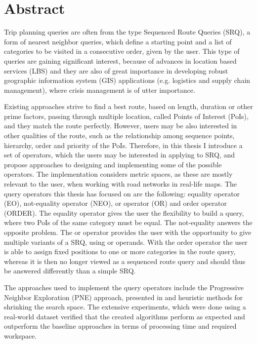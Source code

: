 \chapter{Abstract}
\enlargethispage*{30pt}

Trip planning queries are often from the type Sequenced Route Queries (SRQ), a form of nearest neighbor queries, which define a starting point and a list of categories to be visited in a consecutive order, given by the user. This type of queries are gaining significant interest, because of advances in location based services (LBS) and they are also of great importance in developing robust geographic information system (GIS) applications (e.g. logistics and supply chain management), where crisis management is of utter importance. 

Existing approaches strive to find a best route, based on length, duration or other prime factors, passing through multiple location, called Points of Interest (PoIs), and they match the route perfectly. However, users may be also interested in other qualities of the route, such as the relationship among sequence points, hierarchy, order and priority of the PoIs. Therefore, in this thesis  I introduce a set of operators, which the users may be interested in applying to SRQ, and propose approaches to designing and implementing some of the possible operators. The implementation considers metric spaces, as these are mostly relevant to the user, when working with road networks in real-life maps.
The query operators this thesis has focused on are the following: equality operator (EO), not-equality operator (NEO), or operator (OR) and order operator (ORDER). The equality operator gives the user the flexibility to build a query, where two PoIs of the same category must be equal. The not-equality answers the opposite problem. The or operator provides the user with the opportunity to give multiple variants of a SRQ, using or operands. With the order operator the user is able to assign fixed positions to one or more categories in the route query, whereas it is then no longer viewed as a sequenced route query and should thus be answered differently than a simple SRQ.

The approaches used to implement the query operators include the Progressive Neighbor Exploration (PNE) approach, presented in \cite{OSR} and heuristic methods for shrinking the search space. The extensive experiments, which were done using a real-world dataset verified that the created algorithms perform as expected and outperform the baseline approaches in terms of processing time and required workspace.



\pagebreak